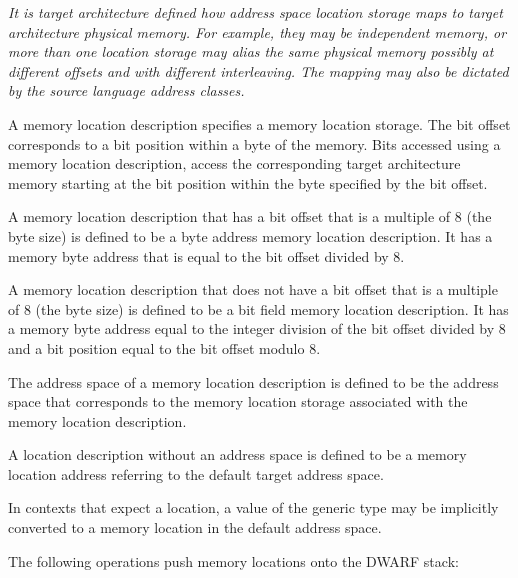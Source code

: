 \textit{It is target architecture defined how address space location
storage maps to target architecture physical memory. For example,
they may be independent memory, or more than one location storage
may alias the same physical memory possibly at different offsets and
with different interleaving. The mapping may also be dictated by the
source language address classes.}

A memory location description specifies a memory location storage.
The bit offset corresponds to a bit position within a byte of the
memory. Bits accessed using a memory location description, access the
corresponding target architecture memory starting at the bit position
within the byte specified by the bit offset.

A memory location description that has a bit offset that is a multiple
of 8 (the byte size) is defined to be a byte address memory location
description. It has a memory byte address that is equal to the bit
offset divided by 8.

A memory location description that does not have a bit offset that is
a multiple of 8 (the byte size) is defined to be a bit field memory
location description. It has a memory byte address equal to the
integer division of the bit offset divided by 8 and a bit position
equal to the bit offset modulo 8.

The address space of a memory location description is defined to be
the address space that corresponds to the memory location storage
associated with the memory location description.

A location description without an address space is defined to be a
memory location address referring to the default target address space.

In contexts that expect a location, a value of the generic type may be
implicitly converted to a memory location in the default address
space.

The following operations push memory locations onto the DWARF stack:

